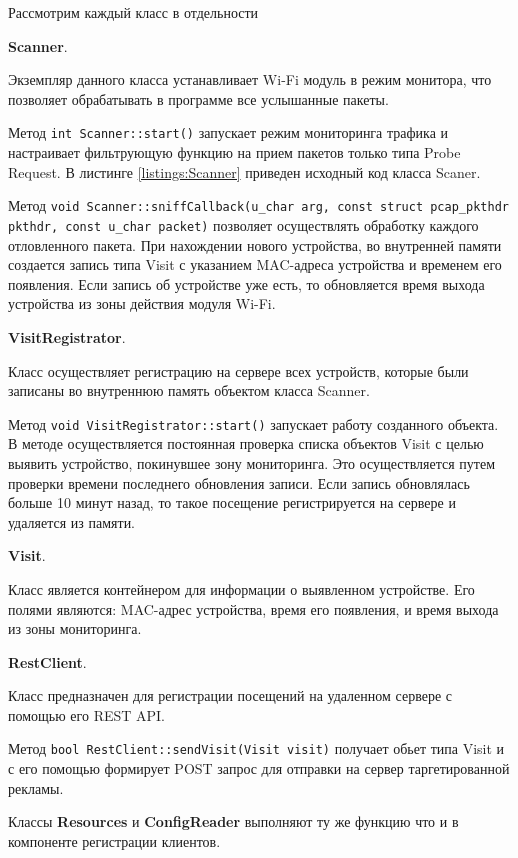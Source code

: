 Рассмотрим каждый класс в отдельности

\textbf{Scanner}.

Экземпляр данного класса устанавливает Wi-Fi модуль в режим монитора, что позволяет обрабатывать в программе все услышанные пакеты.

Метод \texttt{int Scanner::start()} запускает режим мониторинга трафика и настраивает фильтрующую функцию на прием пакетов только типа Probe Request. В листинге \ref{listings:Scanner} приведен исходный код класса Scaner.

Метод \texttt{void Scanner::sniffCallback(u\_char \*arg, const struct pcap\_pkthdr \*pkthdr, const u\_char \*packet)} позволяет осуществлять обработку каждого отловленного пакета. При нахождении нового устройства, во внутренней памяти создается запись типа Visit с указанием MAC-адреса устройства и временем его появления. Если запись об устройстве уже есть, то обновляется время выхода устройства из зоны действия модуля Wi-Fi.

\textbf{VisitRegistrator}.

Класс осуществляет регистрацию на сервере всех устройств, которые были записаны во внутреннюю память объектом класса Scanner.

Метод \texttt{void VisitRegistrator::start()} запускает работу созданного объекта. В методе осуществляется постоянная проверка списка объектов Visit с целью выявить устройство, покинувшее зону мониторинга. Это осуществляется путем проверки времени последнего обновления записи. Если запись обновлялась больше 10 минут назад, то такое посещение регистрируется на сервере и удаляется из памяти.

\textbf{Visit}.

Класс является контейнером для информации о выявленном устройстве. Его полями являются: MAC-адрес устройства, время его появления, и время выхода из зоны мониторинга.

\textbf{RestClient}.

Класс предназначен для регистрации посещений на удаленном сервере с помощью его REST API. 

Метод \texttt{bool RestClient::sendVisit(Visit visit)} получает обьет типа Visit и с его помощью формирует POST запрос для отправки на сервер таргетированной рекламы.

Классы \textbf{Resources} и \textbf{ConfigReader} выполняют ту же функцию что и в компоненте регистрации клиентов.

